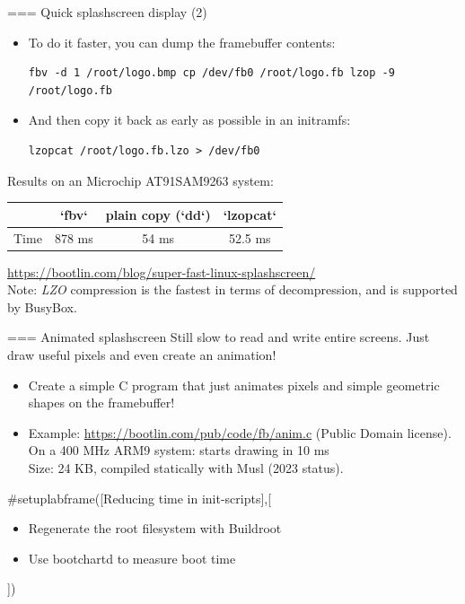 === Quick splashscreen display (2)
\begin{itemize}
\item To do it faster, you can dump the framebuffer contents:\\
      \begin{verbatim}
fbv -d 1 /root/logo.bmp cp /dev/fb0 /root/logo.fb lzop -9 /root/logo.fb
      \end{verbatim}
\item And then copy it back as early as possible in an initramfs:
      \begin{verbatim}
lzopcat /root/logo.fb.lzo > /dev/fb0
      \end{verbatim}
\end{itemize}
Results on an Microchip AT91SAM9263 system: \\
\begin{tabular}{| l || c | c | c | }
\hline
& `fbv` & plain copy (`dd`) & `lzopcat` \\
\hline Time & 878 ms & 54 ms & 52.5 ms\\
\hline
\end{tabular}
\vfill
\footnotesize
\url{https://bootlin.com/blog/super-fast-linux-splashscreen/} \\
Note: {\em LZO} compression is the fastest in terms of decompression, and is supported by BusyBox.


=== Animated splashscreen Still slow to read and write entire screens. Just draw useful pixels and even create an animation!
\begin{itemize}
\item Create a simple C program that just animates pixels and simple
      geometric shapes on the framebuffer!
\item Example: {\small \url{https://bootlin.com/pub/code/fb/anim.c}}
      (Public Domain license).\\
      On a 400 MHz ARM9 system: starts drawing in 10 ms \\
      Size: 24 KB, compiled statically with Musl (2023 status).
\end{itemize}



#setuplabframe([Reducing time in init-scripts],[
\begin{itemize}
\item Regenerate the root filesystem with Buildroot
\item Use bootchartd to measure boot time
\end{itemize}
])
